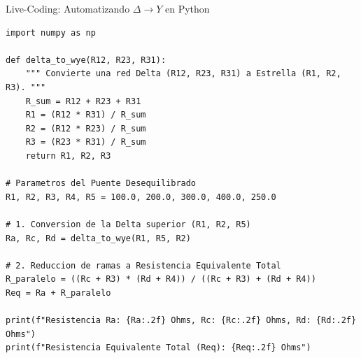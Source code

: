 \documentclass[aspectratio=169, 10pt]{beamer}
\begin{document}
\begin{frame}[fragile]{Live-Coding: Automatizando $\Delta \to Y$ en Python}
\begin{lstlisting}
import numpy as np

def delta_to_wye(R12, R23, R31):
    """ Convierte una red Delta (R12, R23, R31) a Estrella (R1, R2, R3). """
    R_sum = R12 + R23 + R31
    R1 = (R12 * R31) / R_sum
    R2 = (R12 * R23) / R_sum
    R3 = (R23 * R31) / R_sum
    return R1, R2, R3

# Parametros del Puente Desequilibrado
R1, R2, R3, R4, R5 = 100.0, 200.0, 300.0, 400.0, 250.0

# 1. Conversion de la Delta superior (R1, R2, R5)
Ra, Rc, Rd = delta_to_wye(R1, R5, R2)

# 2. Reduccion de ramas a Resistencia Equivalente Total
R_paralelo = ((Rc + R3) * (Rd + R4)) / ((Rc + R3) + (Rd + R4))
Req = Ra + R_paralelo

print(f"Resistencia Ra: {Ra:.2f} Ohms, Rc: {Rc:.2f} Ohms, Rd: {Rd:.2f} Ohms")
print(f"Resistencia Equivalente Total (Req): {Req:.2f} Ohms")
\end{lstlisting}
\end{frame}
\end{document}
